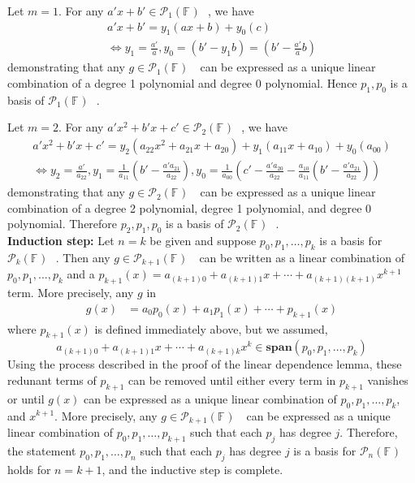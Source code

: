 \documentclass[
	12pt, %
]{fphw}
\newcommand\0{\mathbf{0}}
\newcommand\F[1]{\text{$\mathbb{F}^{#1}$}}
\newcommand\ls[2]{\text{$#1_1, \ldots, #1_{#2}$}}
\newcommand\poly[1]{\text{$\mathcal{P}_{#1}(\F{})$ }}
\newcommand\spann[1]{\mathbf{span}(#1)}
\begin{document}
Let $m = 1$.  For any $a'x + b' \in \poly{1}$, we have
\begin{align*}
a'x + b' = y_1 (ax + b) + y_0(c) \\
\iff y_1 = \frac{a'}{a}, y_0 = (b' - y_1b) = (b' - \frac{a'}{a}b)
\end{align*}
demonstrating that any $g \in \poly{1}$ can be expressed as a unique linear combination of a degree 1 polynomial and degree 0 polynomial. Hence $p_1, p_0$ is a basis of $\poly{1}$. 

Let $m = 2$.  For any $a'x^2 + b'x + c' \in \poly{2}$, we have
\begin{align*}
a'x^2 + b'x + c' = y_2 (a_{22}x^2 + a_{21}x +a_{20}) + y_1(a_{11}x + a_{10}) + y_0 (a_{00}) \\
\iff y_2 = \frac{a'}{a_{22}}, y_1 = \frac{1}{a_{11}}(b' - \frac{a'a_{21}}{a_{22}}), y_0 = \frac{1}{a_{00}}(c' - \frac{a'a_{20}}{a_{22}}-\frac{a_{10}}{a_{11}}(b' - \frac{a'a_{21}}{a_{22}}))
\end{align*}
demonstrating that any $g \in \poly{2}$ can be expressed as a unique linear combination of a degree 2 polynomial, degree 1 polynomial, and degree 0 polynomial. Therefore $p_2, p_1, p_0$ is a basis of $\poly{2}$.\\

\noindent
\textbf{Induction step:} Let $n = k$ be given and suppose $p_0, \ls{p}{k}$ is a basis for $\poly{k}$. Then any $g \in \poly{k+1}$ can be written as a linear combination of $p_0, \ls{p}{k}$ and a $p_{k+1}(x) = a_{(k+1)0} + a_{(k+1)1}x + \cdots + a_{(k+1)(k+1)}x^{k+1}$ term. More precisely, any $g$ in 
\begin{align*}
g(x) &= a_0 p_0(x) + a_1p_1(x) + \cdots + p_{k+1}(x)
\end{align*}
where $p_{k+1}(x)$ is defined immediately above, but we assumed, $$a_{(k+1)0} + a_{(k+1)1}x + \cdots + a_{(k+1)k}x^k \in \spann{p_0, \ls{p}{k}}$$ Using the process described in the proof of the linear dependence lemma, these redunant terms of $p_{k+1}$ can be removed until either every term in $p_{k+1}$ vanishes or until $g(x)$ can be expressed as a unique linear combination of $p_0, \ls{p}{k}$, and $x^{k+1}$. More precisely, any $g \in \poly{k+1}$ can be expressed as a unique linear combination of $p_0, \ls{p}{k+1}$ such that each $p_j$ has degree $j$. Therefore, the statement $p_0, \ls{p}{n}$ such that each $p_j$ has degree $j$ is a basis for $\poly{n}$ holds for $n = k+1$, and the inductive step is complete. 

\newpage
\end{document}

